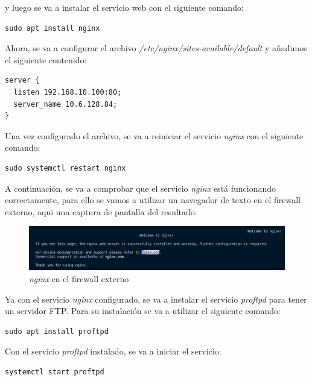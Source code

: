 \documentclass[11pt]{report}
\begin{document}
y luego se va a instalar el servicio web con el siguiente comando:
\begin{BVerbatim}
sudo apt install nginx
\end{BVerbatim}

Ahora, se va a configurar el archivo \emph{/etc/nginx/sites-available/default} y añadimos
el siguiente contenido:
\begin{verbatim}
server {
  listen 192.168.10.100:80;
  server_name 10.6.128.84;
}
\end{verbatim}

Una vez configurado el archivo, se va a reiniciar el servicio \emph{nginx} con el siguiente comando: \\
\begin{BVerbatim}
sudo systemctl restart nginx
\end{BVerbatim}

A continuación, se va a comprobar que el servicio \emph{nginx} está funcionando correctamente, para ello se vamos a utilizar un navegador de texto 
en el firewall externo, aqui una captura de pantalla del resultado:
\begin{figure}[H]
  \centering
  \includegraphics[scale=0.55]{img/nginx_fw_externo.png}
  \caption{\emph{nginx} en el firewall externo}
  \label{fig:nginx en el firewall externo}
\end{figure}


Ya con el servicio \emph{nginx} configurado, se va a instalar el servicio \emph{proftpd} para tener un servidor FTP. Para su instalación
se va a utilizar el siguiente comando:
\begin{BVerbatim}
sudo apt install proftpd
\end{BVerbatim}

Con el servicio \emph{proftpd} instalado, se va a iniciar el servicio:
\begin{BVerbatim}
systemctl start proftpd
\end{BVerbatim}
\end{document}
